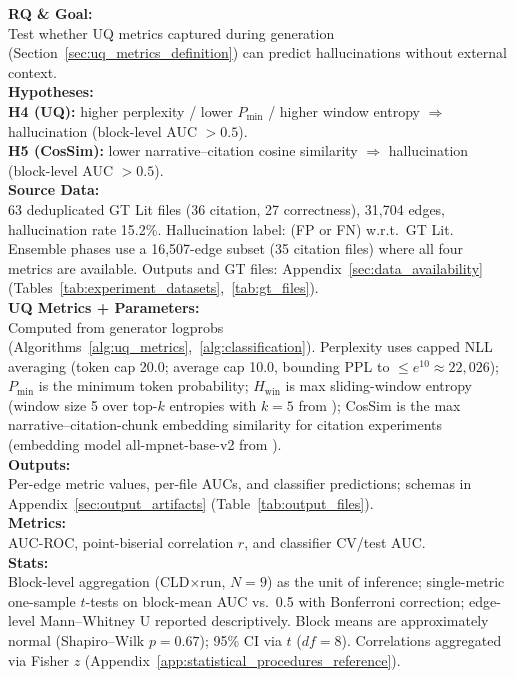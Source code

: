 \noindent\textbf{RQ \& Goal:}\\
Test whether UQ metrics captured during generation (Section~\ref{sec:uq_metrics_definition}) can predict hallucinations without external context.\\
\textbf{Hypotheses:}\\
\textbf{H4 (UQ):} higher perplexity / lower $P_{\min}$ / higher window entropy $\Rightarrow$ hallucination (block-level AUC $>0.5$).\\
\textbf{H5 (CosSim):} lower narrative--citation cosine similarity $\Rightarrow$ hallucination (block-level AUC $>0.5$).\\
\textbf{Source Data:}\\
63 deduplicated GT Lit files (36 citation, 27 correctness), 31{,}704 edges, hallucination rate 15.2\%. Hallucination label: (FP or FN) w.r.t.\ GT Lit. Ensemble phases use a 16{,}507-edge subset (35 citation files) where all four metrics are available. Outputs and GT files: Appendix~\ref{sec:data_availability} (Tables~\ref{tab:experiment_datasets},~\ref{tab:gt_files}).\\
\textbf{UQ Metrics + Parameters:}\\
Computed from generator logprobs (Algorithms~\ref{alg:uq_metrics},~\ref{alg:classification}). Perplexity uses capped NLL averaging (token cap 20.0; average cap 10.0, bounding PPL to $\le e^{10}\approx22{,}026$); $P_{\min}$ is the minimum token probability; $H_{\text{win}}$ is max sliding-window entropy (window size 5 over top-$k$ entropies with $k{=}5$ from \cite{openai2024api}); CosSim is the max narrative--citation-chunk embedding similarity for citation experiments (embedding model all-mpnet-base-v2 from \cite{muennighoff2023mteb}).\\
\textbf{Outputs:}\\
Per-edge metric values, per-file AUCs, and classifier predictions; schemas in Appendix~\ref{sec:output_artifacts} (Table~\ref{tab:output_files}).\\
\textbf{Metrics:}\\
AUC-ROC, point-biserial correlation $r$, and classifier CV/test AUC.\\
\textbf{Stats:}\\
Block-level aggregation (CLD$\times$run, $N{=}9$) as the unit of inference; single-metric one-sample $t$-tests on block-mean AUC vs.\ 0.5 with Bonferroni correction; edge-level Mann--Whitney U reported descriptively. Block means are approximately normal (Shapiro--Wilk $p{=}0.67$); 95\% CI via $t$ ($df{=}8$). Correlations aggregated via Fisher $z$ (Appendix~\ref{app:statistical_procedures_reference}).

